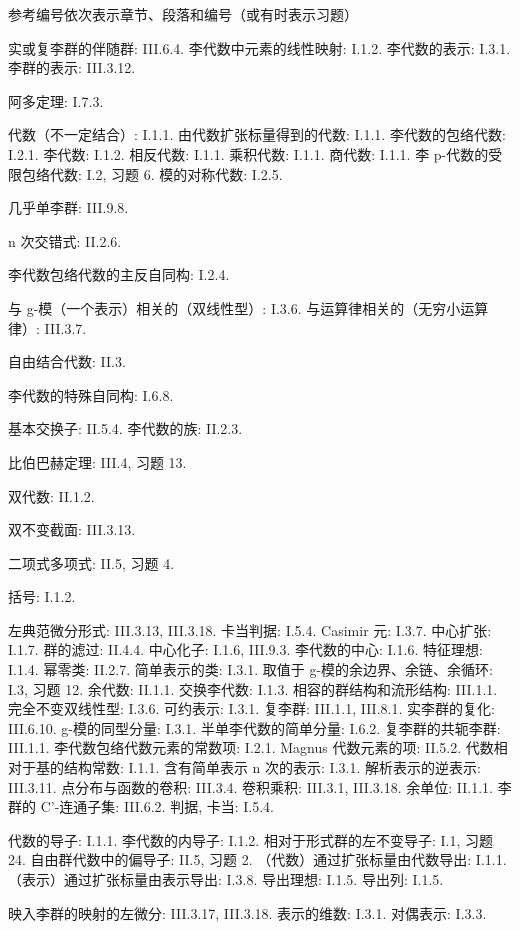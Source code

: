 
参考编号依次表示章节、段落和编号（或有时表示习题）

实或复李群的伴随群: III.6.4. 李代数中元素的线性映射: I.1.2. 李代数的表示: I.3.1. 李群的表示: III.3.12.

阿多定理: I.7.3.

代数（不一定结合）: I.1.1. 由代数扩张标量得到的代数: I.1.1. 李代数的包络代数: I.2.1. 李代数: I.1.2. 相反代数: I.1.1. 乘积代数: I.1.1. 商代数: I.1.1. 李 p-代数的受限包络代数: I.2, 习题 6. 模的对称代数: I.2.5.

几乎单李群: III.9.8.

n 次交错式: II.2.6.

李代数包络代数的主反自同构: I.2.4.

与 g-模（一个表示）相关的（双线性型）: I.3.6. 与运算律相关的（无穷小运算律）: III.3.7.

自由结合代数: II.3.

李代数的特殊自同构: I.6.8.

基本交换子: II.5.4. 李代数的族: II.2.3.

比伯巴赫定理: III.4, 习题 13.

双代数: II.1.2.

双不变截面: III.3.13.

二项式多项式: II.5, 习题 4.

括号: I.1.2.

左典范微分形式: III.3.13, III.3.18. 卡当判据: I.5.4. Casimir 元: I.3.7. 中心扩张: I.1.7. 群的滤过: II.4.4. 中心化子: I.1.6, III.9.3. 李代数的中心: I.1.6. 特征理想: I.1.4. 幂零类: II.2.7. 简单表示的类: I.3.1. 取值于 g-模的余边界、余链、余循环: I.3, 习题 12. 余代数: II.1.1. 交换李代数: I.1.3. 相容的群结构和流形结构: III.1.1. 完全不变双线性型: I.3.6. 可约表示: I.3.1. 复李群: III.1.1, III.8.1. 实李群的复化: III.6.10. g-模的同型分量: I.3.1. 半单李代数的简单分量: I.6.2. 复李群的共轭李群: III.1.1. 李代数包络代数元素的常数项: I.2.1. Magnus 代数元素的项: II.5.2. 代数相对于基的结构常数: I.1.1. 含有简单表示 n 次的表示: I.3.1. 解析表示的逆表示: III.3.11. 点分布与函数的卷积: III.3.4. 卷积乘积: III.3.1, III.3.18. 余单位: II.1.1. 李群的 C'-连通子集: III.6.2. 判据, 卡当: I.5.4.

代数的导子: I.1.1. 李代数的内导子: I.1.2. 相对于形式群的左不变导子: I.1, 习题 24. 自由群代数中的偏导子: II.5, 习题 2. （代数）通过扩张标量由代数导出: I.1.1. （表示）通过扩张标量由表示导出: I.3.8. 导出理想: I.1.5. 导出列: I.1.5.

映入李群的映射的左微分: III.3.17, III.3.18. 表示的维数: I.3.1. 对偶表示: I.3.3.


